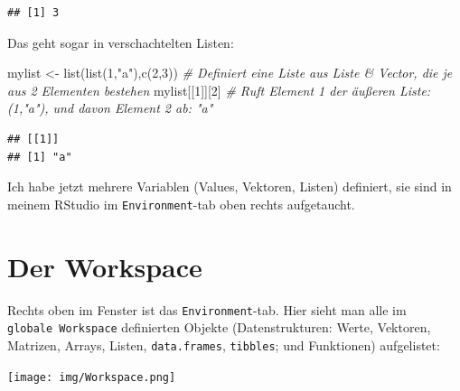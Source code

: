 \documentclass[
]{book}
\newenvironment{Shaded}{\begin{snugshade}}{\end{snugshade}}
\newcommand{\CommentTok}[1]{\textcolor[rgb]{0.56,0.35,0.01}{\textit{#1}}}
\newcommand{\DecValTok}[1]{\textcolor[rgb]{0.00,0.00,0.81}{#1}}
\newcommand{\FunctionTok}[1]{\textcolor[rgb]{0.00,0.00,0.00}{#1}}
\newcommand{\NormalTok}[1]{#1}
\newcommand{\OtherTok}[1]{\textcolor[rgb]{0.56,0.35,0.01}{#1}}
\newcommand{\StringTok}[1]{\textcolor[rgb]{0.31,0.60,0.02}{#1}}
\theoremstyle{definition}
\theoremstyle{definition}
\theoremstyle{definition}
\theoremstyle{definition}
\theoremstyle{remark}
\begin{document}
\begin{verbatim}
## [1] 3
\end{verbatim}

Das geht sogar in verschachtelten Listen:

\begin{Shaded}
\begin{Highlighting}[]
\NormalTok{mylist }\OtherTok{\textless{}{-}} \FunctionTok{list}\NormalTok{(}\FunctionTok{list}\NormalTok{(}\DecValTok{1}\NormalTok{,}\StringTok{"a"}\NormalTok{),}\FunctionTok{c}\NormalTok{(}\DecValTok{2}\NormalTok{,}\DecValTok{3}\NormalTok{)) }\CommentTok{\# Definiert eine Liste aus Liste \& Vector, die je aus 2 Elementen bestehen }
\NormalTok{mylist[[}\DecValTok{1}\NormalTok{]][}\DecValTok{2}\NormalTok{]                     }\CommentTok{\# Ruft Element 1 der äußeren Liste: (1,"a"), und davon Element 2 ab: "a"}
\end{Highlighting}
\end{Shaded}

\begin{verbatim}
## [[1]]
## [1] "a"
\end{verbatim}

Ich habe jetzt mehrere Variablen (Values, Vektoren, Listen) definiert, sie sind in meinem RStudio im \texttt{Environment}-tab oben rechts aufgetaucht.

\hypertarget{der-workspace}{%
\section{Der Workspace}\label{der-workspace}}

Rechts oben im Fenster ist das \texttt{Environment}-tab. Hier sieht man alle im \texttt{globale\ Workspace} definierten Objekte (Datenstrukturen: Werte, Vektoren, Matrizen, Arrays, Listen, \texttt{data.frames}, \texttt{tibbles}; und Funktionen) aufgelistet:

\texttt{[image: img/Workspace.png]}
\end{document}
